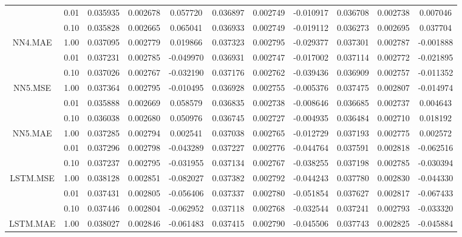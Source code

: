 \begin{longtable}{ccccccccccc}
\cmidrule{1-11}
 & 0.01 & 0.035935 & 0.002678 & 0.057720 & 0.036897 & 0.002749 & -0.010917 & 0.036708 & 0.002738 & 0.007046\\
\cmidrule{2-11}
 & 0.10 & 0.035828 & 0.002665 & 0.065041 & 0.036933 & 0.002749 & -0.019112 & 0.036273 & 0.002695 & 0.037704\\
\cmidrule{2-11}
\multirow{-3}{*}{\centering\arraybackslash NN4.MAE} & 1.00 & 0.037095 & 0.002779 & 0.019866 & 0.037323 & 0.002795 & -0.029377 & 0.037301 & 0.002787 & -0.001888\\
\cmidrule{1-11}
 & 0.01 & 0.037231 & 0.002785 & -0.049970 & 0.036931 & 0.002747 & -0.017002 & 0.037114 & 0.002772 & -0.021895\\
\cmidrule{2-11}
 & 0.10 & 0.037026 & 0.002767 & -0.032190 & 0.037176 & 0.002762 & -0.039436 & 0.036909 & 0.002757 & -0.011352\\
\cmidrule{2-11}
\multirow{-3}{*}{\centering\arraybackslash NN5.MSE} & 1.00 & 0.037364 & 0.002795 & -0.010495 & 0.036928 & 0.002755 & -0.005376 & 0.037475 & 0.002807 & -0.014974\\
\cmidrule{1-11}
 & 0.01 & 0.035888 & 0.002669 & 0.058579 & 0.036835 & 0.002738 & -0.008646 & 0.036685 & 0.002737 & 0.004643\\
\cmidrule{2-11}
 & 0.10 & 0.036038 & 0.002680 & 0.050976 & 0.036745 & 0.002727 & -0.004935 & 0.036484 & 0.002710 & 0.018192\\
\cmidrule{2-11}
\multirow{-3}{*}{\centering\arraybackslash NN5.MAE} & 1.00 & 0.037285 & 0.002794 & 0.002541 & 0.037038 & 0.002765 & -0.012729 & 0.037193 & 0.002775 & 0.002572\\
\cmidrule{1-11}
 & 0.01 & 0.037296 & 0.002798 & -0.043289 & 0.037227 & 0.002776 & -0.044764 & 0.037591 & 0.002818 & -0.062516\\
\cmidrule{2-11}
 & 0.10 & 0.037237 & 0.002795 & -0.031955 & 0.037134 & 0.002767 & -0.038255 & 0.037198 & 0.002785 & -0.030394\\
\cmidrule{2-11}
\multirow{-3}{*}{\centering\arraybackslash LSTM.MSE} & 1.00 & 0.038128 & 0.002851 & -0.082027 & 0.037382 & 0.002792 & -0.044243 & 0.037780 & 0.002830 & -0.044330\\
\cmidrule{1-11}
 & 0.01 & 0.037431 & 0.002805 & -0.056406 & 0.037337 & 0.002780 & -0.051854 & 0.037627 & 0.002817 & -0.067433\\
\cmidrule{2-11}
 & 0.10 & 0.037446 & 0.002804 & -0.062952 & 0.037118 & 0.002768 & -0.032544 & 0.037241 & 0.002793 & -0.033320\\
\cmidrule{2-11}
\multirow{-3}{*}{\centering\arraybackslash LSTM.MAE} & 1.00 & 0.038027 & 0.002846 & -0.061483 & 0.037415 & 0.002790 & -0.045506 & 0.037743 & 0.002825 & -0.045884\\

\end{longtable}
